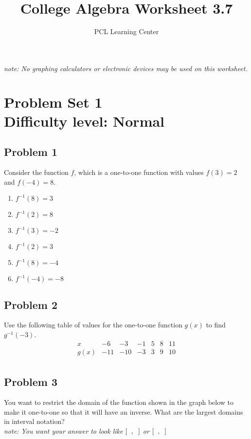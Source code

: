 \documentclass[12pt]{article}
\title{College Algebra Worksheet 3.7}
\author{PCL Learning Center}
\date{}
\begin{document}
\maketitle

\begin{center}
    \textit{note: No graphing calculators or electronic devices may be used on this worksheet.}    
\end{center}

\section*{Problem Set 1\\Difficulty level: Normal}
\subsection*{Problem 1}
Consider the function \(f\), which is a one-to-one function with values \(f(3)=2\) and \(f(-4)=8\).
    \begin{enumerate}[label=(\alph*)]
        \item \( f^{-1}(8) = 3 \)
        \item \( f^{-1}(2) = 8 \)
        \item \( f^{-1}(3) = -2 \)
        \item \( f^{-1}(2) = 3 \)
        \item \( f^{-1}(8) = -4 \)
        \item \( f^{-1}(-4) = -8 \)
    \end{enumerate}

\subsection*{Problem 2}
Use the following table of values for the one-to-one function \(g(x)\) to find \(g^{-1}(-3)\).
\[
\begin{array}{c|cccccc}
x & -6 & -3 & -1 & 5 & 8 & 11 \\
\hline
g(x) & -11 & -10 & -3 & 3 & 9 & 10 \\
\end{array}
\]

\subsection*{Problem 3}
You want to restrict the domain of the function shown in the graph below to make it one-to-one so that it will have an inverse. What are the largest domains in interval notation?\\
\textit{note: You want your answer to look like \([\hspace{0.2cm},\hspace{0.2cm}]\) or \([\hspace{0.2cm},\hspace{0.2cm}]\)}
\end{document}
